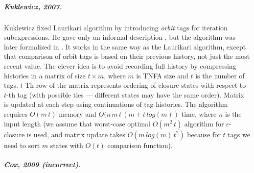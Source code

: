 \documentclass[AMA,STIX1COL]{WileyNJD-v2}
\begin{document}
\subparagraph{Kuklewicz, 2007.}

Kuklewicz fixed Laurikari algorithm by introducing \emph{orbit} tags for iteration subexpressions.
He gave only an informal description \cite{Kuk07}, but the algorithm was later formalized in \cite{Tro17}.
It works in the same way as the Laurikari algorithm,
except that comparison of orbit tags is based on their previous history, not just the most recent value.
The clever idea is to avoid recording full history
by compressing histories in a matrix of size $t \times m$, where $m$ is TNFA size and $t$ is the number of tags.
$t$-Th row of the matrix represents ordering of closure states with respect to $t$-th tag
(with possible ties --- different states may have the same order).
Matrix is updated at each step using continuations of tag histories.
The algorithm requires $O(m \, t)$ memory and $O(n \, m \, t \, (m + t \, log(m))$ time, where $n$ is the input length
(we assume that worst-case optimal $O(m^2 \, t)$ algorithm for $\epsilon$-closure is used,
and matrix update takes $O(m \, log(m) \, t^2)$ because for $t$ tags we need to sort $m$ states with $O(t)$ comparison function).

\subparagraph{Cox, 2009 (incorrect).}
\end{document}
